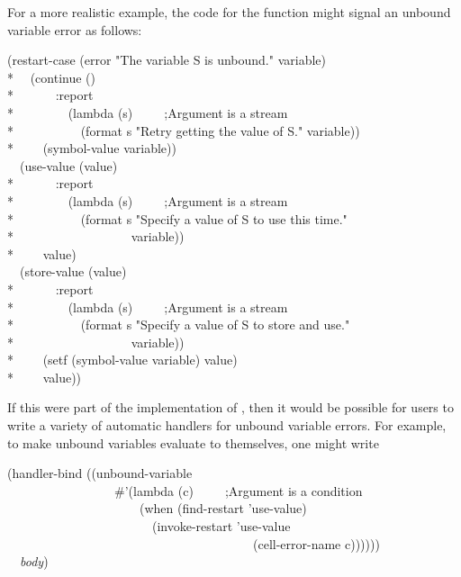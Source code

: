 For a more realistic example, the code for the function  might signal an
unbound variable error as follows:
\begin{lisp}
(restart-case (error "The variable {\Xtilde}S is unbound." variable) \\*
~~(continue () \\*
~~~~~~:report \\*
~~~~~~~~(lambda (s)~~~~~;\textrm{Argument  is a stream} \\*
~~~~~~~~~~(format s "Retry getting the value of {\Xtilde}S." variable)) \\*
~~~~(symbol-value variable)) \\
~~(use-value (value) \\*
~~~~~~:report \\*
~~~~~~~~(lambda (s)~~~~~;\textrm{Argument  is a stream} \\*
~~~~~~~~~~(format s "Specify a value of {\Xtilde}S to use this time." \\*
~~~~~~~~~~~~~~~~~~variable)) \\*
~~~~value) \\
~~(store-value (value) \\*
~~~~~~:report \\*
~~~~~~~~(lambda (s)~~~~~;\textrm{Argument  is a stream} \\*
~~~~~~~~~~(format s "Specify a value of {\Xtilde}S to store and use." \\*
~~~~~~~~~~~~~~~~~~variable)) \\*
~~~~(setf (symbol-value variable) value) \\*
~~~~value))
\end{lisp}
If this were part of the implementation of , then it would be possible
for users to write a variety of automatic handlers for unbound variable
errors. For example, to make unbound variables evaluate to themselves, one
might write
\begin{lisp}
(handler-bind ((unbound-variable \\
~~~~~~~~~~~~~~~~~\#'(lambda (c)~~~~~;\textrm{Argument  is a condition} \\
~~~~~~~~~~~~~~~~~~~~~(when (find-restart 'use-value) \\
~~~~~~~~~~~~~~~~~~~~~~~(invoke-restart 'use-value \\
~~~~~~~~~~~~~~~~~~~~~~~~~~~~~~~~~~~~~~~(cell-error-name c)))))) \\
~~\emph{body})
\end{lisp}

